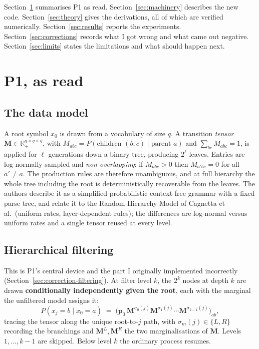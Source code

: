 \documentclass[11pt]{article}
\theoremstyle{remark}
\newcommand{\R}{\mathbb{R}}
\begin{document}
Section~\ref{sec:p1} summarises P1 as read. Section~\ref{sec:machinery}
describes the new code. Section~\ref{sec:theory} gives the derivations, all of
which are verified numerically. Section~\ref{sec:results} reports the
experiments. Section~\ref{sec:corrections} records what I got wrong and what
came out negative. Section~\ref{sec:limits} states the limitations and what
should happen next.

\section{P1, as read}
\label{sec:p1}

\subsection{The data model}

A root symbol $x_0$ is drawn from a vocabulary of size $q$. A transition
\emph{tensor} $\bm M \in \R_+^{q\times q\times q}$, with
$M_{abc} = P(\text{children } (b,c) \mid \text{parent } a)$ and
$\sum_{bc} M_{abc} = 1$, is applied for $\ell$ generations down a binary tree,
producing $2^\ell$ leaves. Entries are log-normally sampled and
\emph{non-overlapping}: if $M_{abc}>0$ then $M_{a'bc}=0$ for all $a'\neq a$. The
production rules are therefore unambiguous, and at full hierarchy the whole
tree including the root is deterministically recoverable from the leaves. The
authors describe it as a simplified probabilistic context-free grammar with a
fixed parse tree, and relate it to the Random Hierarchy Model of Cagnetta et
al.\ (uniform rates, layer-dependent rules); the differences are log-normal
versus uniform rates and a single tensor reused at every level.

\subsection{Hierarchical filtering}
\label{sec:filtering-def}

This is P1's central device and the part I originally implemented incorrectly
(Section~\ref{sec:correction-filtering}). At filter level $k$, the $2^k$ nodes
at depth $k$ are drawn \textbf{conditionally independently given the root},
each with the marginal the unfiltered model assigns it:
\begin{equation}
  P(x_j = b \mid x_0 = a)
  \;=\;
  \bigl(\bm p_0\, \bm M^{\sigma_0(j)} \bm M^{\sigma_1(j)} \cdots
        \bm M^{\sigma_{k-1}(j)}\bigr)_{ab},
\end{equation}
tracing the tensor along the unique root-to-$j$ path, with
$\sigma_m(j)\in\{L,R\}$ recording the branchings and $\bm M^{L},\bm M^{R}$ the
two marginalisations of $\bm M$. Levels $1,\dots,k-1$ are skipped. Below level
$k$ the ordinary process resumes.
\end{document}
